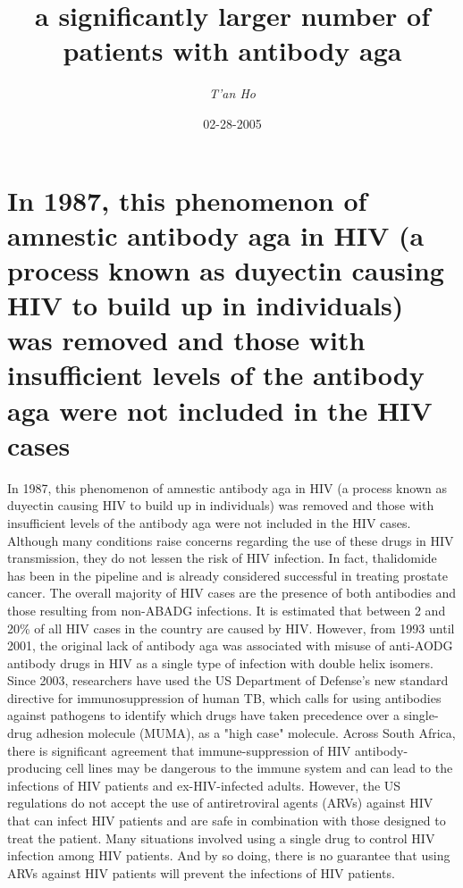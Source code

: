 \documentclass{article}%
\title{a significantly larger number of patients with antibody aga}%
\author{\textit{T'an Ho}}%
\date{02-28-2005}%
\begin{document}
%
\normalsize%
\maketitle%
\section{In 1987, this phenomenon of amnestic antibody aga in HIV (a process known as duyectin causing HIV to build up in individuals) was removed and those with insufficient levels of the antibody aga were not included in the HIV cases}%
\label{sec:In1987,thisphenomenonofamnesticantibodyagainHIV(aprocessknownasduyectincausingHIVtobuildupinindividuals)wasremovedandthosewithinsufficientlevelsoftheantibodyagawerenotincludedintheHIVcases}%
In 1987, this phenomenon of amnestic antibody aga in HIV (a process known as duyectin causing HIV to build up in individuals) was removed and those with insufficient levels of the antibody aga were not included in the HIV cases. Although many conditions raise concerns regarding the use of these drugs in HIV transmission, they do not lessen the risk of HIV infection. In fact, thalidomide has been in the pipeline and is already considered successful in treating prostate cancer.\newline%
The overall majority of HIV cases are the presence of both antibodies and those resulting from non{-}ABADG infections. It is estimated that between 2 and 20\% of all HIV cases in the country are caused by HIV. However, from 1993 until 2001, the original lack of antibody aga was associated with misuse of anti{-}AODG antibody drugs in HIV as a single type of infection with double helix isomers.\newline%
Since 2003, researchers have used the US Department of Defense's new standard directive for immunosuppression of human TB, which calls for using antibodies against pathogens to identify which drugs have taken precedence over a single{-}drug adhesion molecule (MUMA), as a "high case" molecule.\newline%
Across South Africa, there is significant agreement that immune{-}suppression of HIV antibody{-}producing cell lines may be dangerous to the immune system and can lead to the infections of HIV patients and ex{-}HIV{-}infected adults. However, the US regulations do not accept the use of antiretroviral agents (ARVs) against HIV that can infect HIV patients and are safe in combination with those designed to treat the patient. Many situations involved using a single drug to control HIV infection among HIV patients. And by so doing, there is no guarantee that using ARVs against HIV patients will prevent the infections of HIV patients.\newline%
\end{document}
